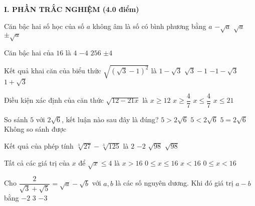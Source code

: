 \noindent\textbf{I. PHẦN TRẮC NGHIỆM (4.0 điểm)}
\begin{bt}	 %
	Căn bậc hai số học của số $a$ không âm là
	\choice
	{số có bình phương bằng $a$}
	{$-\sqrt{a}$}
	{\True $\sqrt{a}$}
	{$\pm \sqrt{a}$}
\end{bt}
\begin{bt}
	Căn bậc hai của $16$ là
	\choice
	{$4$}
	{$-4$}
	{$256$}
	{\True $\pm 4$}
\end{bt}
\begin{bt}
	Kết quả khai căn của biểu thức $\sqrt{\left(\sqrt{3}-1\right)^2}$ là
	\choice
	{$1-\sqrt{3}$}
	{\True $\sqrt{3}-1$}
	{$-1-\sqrt{3}$}
	{$1+\sqrt{3}$}
\end{bt}
\begin{bt}
	Điều kiện xác định của căn thức $\sqrt{12-21x}$ là
	\choice
	{$x\geq 12$}
	{$x\geq \dfrac{4}{7}$}
	{\True $x\leq \dfrac{4}{7}$}
	{$x\leq 21$}
\end{bt}
\begin{bt}
	So sánh $5$ với $2\sqrt{6}$, kết luận nào sau đây là đúng?
	\choice
	{\True $5>2\sqrt{6}$}
	{$5<2\sqrt{6}$}
	{$5=2\sqrt{6}$}
	{Không so sánh được}
\end{bt}
\begin{bt}
	Kết quả của phép tính $\sqrt[3]{27}-\sqrt[3]{125}$ là
	\choice
	{$2$}
	{\True $-2$}
	{$\sqrt{98}$}
	{$\sqrt{98}$}
\end{bt}
\begin{bt}
	Tất cả các giá trị của $x$ để $\sqrt{x}\leq 4$ là
	\choice
	{$x>16$}
	{\True $0\leq x\leq 16$}
	{$x<16$}
	{$0\leq x< 16$}
\end{bt}
\begin{bt}
	Cho $\dfrac{2}{\sqrt{3}+\sqrt{5}}=\sqrt{a}-\sqrt{b}$ với $a,b$ là các số nguyên dương. Khi đó giá trị $a-b$ bằng
	{$-2$}
	{$3$}
	{$-3$}
\end{bt}
